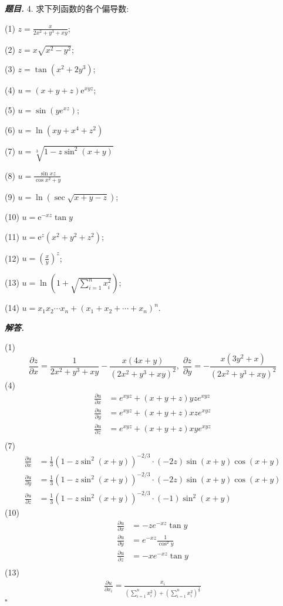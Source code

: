 \documentclass[10pt, a4paper, oneside]{ctexart}
\newenvironment{problem}{\begin{framed}\par\noindent\textbf{\textit{题目. }}}{\end{framed}\par}
\newenvironment{solution}{%
  \par\noindent\textbf{\textit{解答. }}\ignorespaces
}{%
  \hfill\ensuremath{\square}\par %
}
\begin{document}
\begin{problem}
4. 求下列函数的各个偏导数:

(1) $z=\frac{x}{2 x^2+y^3+x y}$;

(2) $z=x \sqrt{x^2-y^2}$;

(3) $z=\tan \left(x^2+2 y^3\right)$;

(4) $u=(x+y+z) \mathrm{e}^{x y z}$;

(5) $u=\sin \left(y e^{x z}\right)$;

(6) $u=\ln \left(x y+x^4+z^2\right)$

(7) $u=\sqrt[3]{1-z \sin ^2(x+y)}$

(8) $u=\frac{\sin x z}{\cos x^2+y}$

(9) $u=\ln (\sec \sqrt{x+y-z})$;

(10) $u=\mathrm{e}^{-x z} \tan y$

(11) $u=\mathrm{e}^z\left(x^2+y^2+z^2\right)$;

(12) $u=\left(\frac{x}{y}\right)^z$;

(13) $u=\ln \left(1+\sqrt{\sum_{i=1}^n x_i^2}\right)$;

(14) $u=x_1 x_2 \cdots x_n+\left(x_1+x_2+\cdots+x_n\right)^n$.
\end{problem}
\begin{solution}
(1)
$$\frac{\partial z}{\partial x}=\frac{1}{2x^2+y^3+xy}-\frac{x(4x+y)}{(2x^2+y^3+xy)^2}, \;\frac{\partial z}{\partial y}=-\frac{x(3y^2+x)}{(2x^2+y^3+xy)^2}$$
(4)
\begin{align*}
\frac{\partial u}{\partial x}&=e^{xyz}+(x+y+z)yze^{xyz}\\
\frac{\partial u}{\partial y}&=e^{xyz}+(x+y+z)xze^{xyz}\\
\frac{\partial u}{\partial z}&=e^{xyz}+(x+y+z)xye^{xyz}\\
\end{align*}
(7)
\begin{align*}
    \frac{\partial u}{\partial x}&=\frac{1}{3}(1-z\sin^2 (x+y))^{-2/3}\cdot(-2z)\sin(x+y)\cos(x+y)\\
    \frac{\partial u}{\partial y}&=\frac{1}{3}(1-z\sin^2 (x+y))^{-2/3}\cdot(-2z)\sin(x+y)\cos(x+y)\\
    \frac{\partial u}{\partial z}&=\frac{1}{3}(1-z\sin^2 (x+y))^{-2/3}\cdot(-1)\sin^2(x+y)
\end{align*}
(10)
\begin{align*}
    \frac{\partial u}{\partial x}&=-ze^{-xz}\tan y\\
    \frac{\partial u}{\partial y}&=e^{-xz}\frac{1}{\cos^2 y}\\
    \frac{\partial u}{\partial z}&=-xe^{-xz}\tan y\\
\end{align*}
(13)
\begin{align*}
    \frac{\partial u}{\partial x_i}=\frac{x_i}{(\sum_{i=1}^n x_i^2)+(\sum_{i=1}^n x_i^2)^{\frac{1}{2}}}
\end{align*}
\end{solution}
\end{document}
